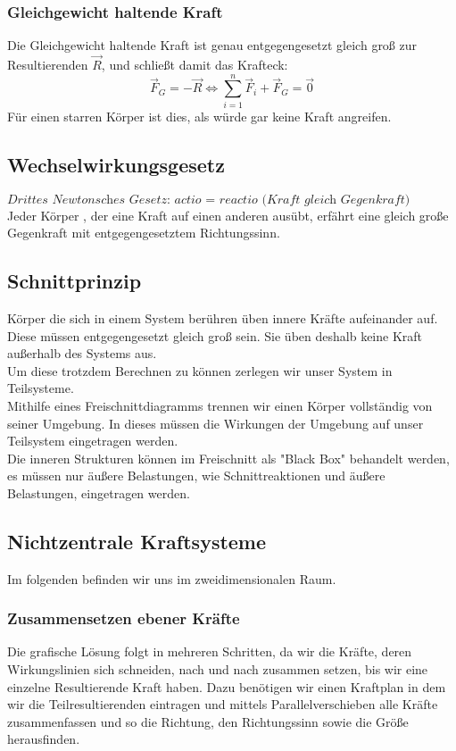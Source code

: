 \documentclass[a4paper,parskip=half*,DIV=7,fontsize=11pt]{scrartcl}
\begin{document}
\subsubsection{Gleichgewicht haltende Kraft}
Die Gleichgewicht haltende Kraft ist genau entgegengesetzt gleich groß zur Resultierenden $\overrightarrow{R}$, und schließt damit das Krafteck:\\
$$\overrightarrow{F}_G=-\overrightarrow{R} \Leftrightarrow \sum_{i=1}^{n} \overrightarrow{F}_i+\overrightarrow{F}_G=\overrightarrow{0}$$
Für einen starren Körper ist dies, als würde gar keine Kraft angreifen.

\subsection{Wechselwirkungsgesetz}
$\textit{Drittes Newtonsches Gesetz: actio = reactio (Kraft gleich Gegenkraft)}$\\
Jeder Körper , der eine Kraft auf einen anderen ausübt, erfährt eine gleich große Gegenkraft mit entgegengesetztem Richtungssinn.

\subsection{Schnittprinzip}
Körper die sich in einem System berühren üben innere Kräfte aufeinander auf. Diese müssen entgegengesetzt gleich groß sein. Sie üben deshalb keine Kraft außerhalb des Systems aus.\\
Um diese trotzdem Berechnen zu können zerlegen wir unser System in Teilsysteme.\\
Mithilfe eines Freischnittdiagramms trennen wir einen Körper vollständig von seiner Umgebung. In dieses müssen die Wirkungen der Umgebung auf unser Teilsystem eingetragen werden.\\
Die inneren Strukturen können im Freischnitt als "Black Box" behandelt werden, es müssen nur äußere Belastungen, wie Schnittreaktionen und äußere Belastungen, eingetragen werden.

\subsection{Nichtzentrale Kraftsysteme}
Im folgenden befinden wir uns im zweidimensionalen Raum.

\subsubsection{Zusammensetzen ebener Kräfte}
Die grafische Lösung folgt in mehreren Schritten, da wir die Kräfte, deren Wirkungslinien sich schneiden, nach und nach zusammen setzen, bis wir eine einzelne Resultierende Kraft haben. Dazu benötigen wir einen Kraftplan in dem wir die Teilresultierenden eintragen und mittels Parallelverschieben alle Kräfte zusammenfassen und so die Richtung, den Richtungssinn sowie die Größe herausfinden.
\end{document}
